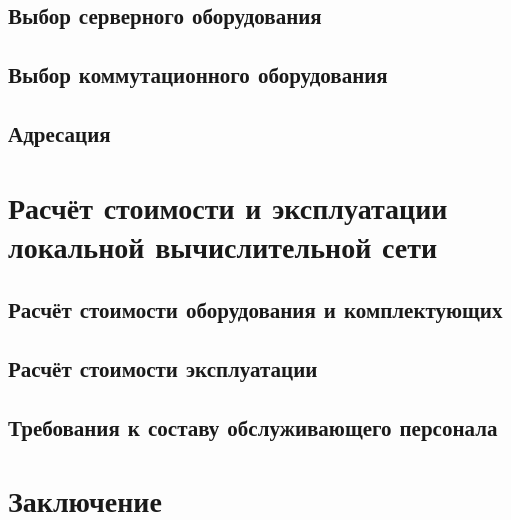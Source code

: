 \documentclass[a4paper,14pt,russian]{article}
\begin{document}
\subsection{Выбор серверного оборудования}


\subsection{Выбор коммутационного оборудования}


\subsection{Адресация}


\section{Расчёт стоимости и эксплуатации локальной вычислительной сети}

\subsection{Расчёт стоимости оборудования и комплектующих}


\subsection{Расчёт стоимости эксплуатации}


\subsection{Требования к составу обслуживающего персонала}


\section*{Заключение}

\renewcommand\refname{Список использованных источников}
\nocite{*}


\end{document}
